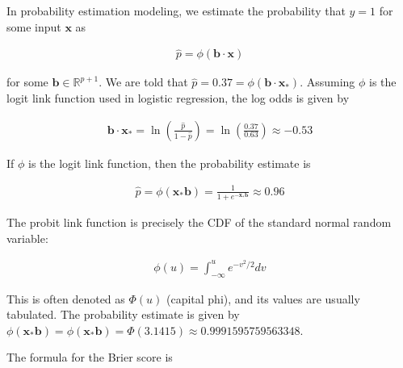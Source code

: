 \documentclass[12pt]{article}
\begin{document}
\begin{enumerate}

In probability estimation modeling, we estimate the probability that
$y=1$ for some input $\bm{x}$ as

\begin{align*}
	\hat{p} = \phi(\bm{b}\cdot \bm{x})
\end{align*}

for some $\bm{b}\in \mathbb{R}^{p+1}$. We are told that $
\hat{p}=0.37 = \phi(\bm{b}\cdot \bm{x}_*)$. Assuming $\phi$ is the logit
link function used in logistic regression, the log odds is given by

\begin{align*}
	\bm{b}\cdot \bm{x}_*
	= \ln \left(\frac{\hat{p}}{1-\hat{p}}\right)
	= \ln\left(\frac{0.37}{0.63}\right)
	\approx -0.53
\end{align*}


If $\phi$ is the logit link function, then the probability estimate is

\begin{align*}
	\hat{p} = \phi(\bm{x}_* \bm{b}) = \frac{1}{1 + e^{-\bm{x}_*\bm{b}}} \approx 0.96
\end{align*}


The probit link function is precisely the CDF of the standard normal random variable:

\begin{align*}
	\phi(u) = \int_{-\infty}^{u}e^{-v^2 / 2} dv
\end{align*}

This is often denoted as $\Phi(u)$ (capital phi), and its values are usually
tabulated. The probability estimate is given by
$\phi(\bm{x}_*\bm{b})=\phi(\bm{x}_*\bm{b}) = \Phi(3.1415)\approx 0.9991595759563348$.


The formula for the Brier score is


\end{enumerate}
\end{document}
